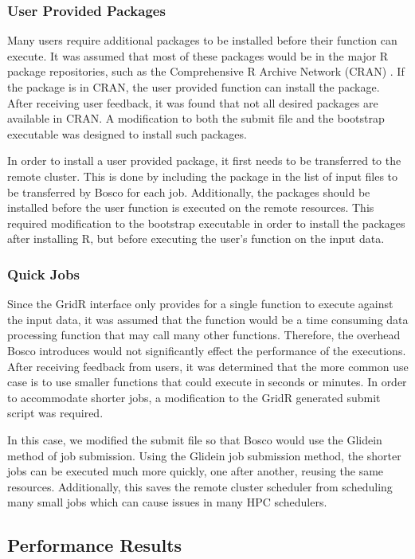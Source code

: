 \subsubsection{User Provided Packages}

Many users require additional packages to be installed before their function can execute.  It was assumed that most of these packages would be in the major R package repositories, such as the Comprehensive R Archive Network (CRAN) \cite{cran}.  If the package is in CRAN, the user provided function can install the package.  After receiving user feedback, it was found that not all desired packages are available in CRAN.  A modification to both the submit file and the bootstrap executable was designed to install such packages.

In order to install a user provided package, it first needs to be transferred to the remote cluster.  This is done by including the package in the list of input files to be transferred by Bosco for each job.  Additionally, the packages should be installed before the user function is executed on the remote resources.  This required modification to the bootstrap executable in order to install the packages after installing R, but before executing the user's function on the input data.

\subsubsection{Quick Jobs}
Since the GridR interface only provides for a single function to execute against the input data, it was assumed that the function would be a time consuming data processing function that may call many other functions.  Therefore, the overhead Bosco introduces would not significantly effect the performance of the executions.  After receiving feedback from users, it was determined that the more common use case is to use smaller functions that could execute in seconds or minutes.  In order to accommodate shorter jobs, a modification to the GridR generated submit script was required.

In this case, we modified the submit file so that Bosco would use the Glidein method of job submission.  Using the Glidein job submission method, the shorter jobs can be executed much more quickly, one after another, reusing the same resources.  Additionally, this saves the remote cluster scheduler from scheduling many small jobs which can cause issues in many HPC schedulers.


\subsection{Performance Results}

